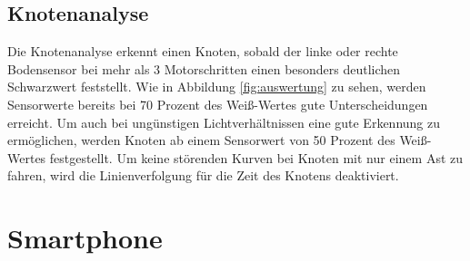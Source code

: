 \documentclass[10pt,a4paper]{article}
\let\oldsection\section
\renewcommand{\section}{\newpage \oldsection}
\begin{document}
			\subsection{Knotenanalyse}
			Die Knotenanalyse erkennt einen Knoten, sobald der linke oder rechte Bodensensor bei mehr als 3 Motorschritten einen besonders
			deutlichen Schwarzwert feststellt. Wie in Abbildung \ref{fig:auswertung} zu sehen, werden Sensorwerte bereits bei 70 Prozent des
			Weiß-Wertes gute Unterscheidungen erreicht. Um auch bei ungünstigen Lichtverhältnissen eine gute Erkennung zu ermöglichen,
			werden Knoten ab einem Sensorwert von 50 Prozent des Weiß-Wertes festgestellt. Um keine störenden Kurven bei Knoten mit nur einem
			Ast zu fahren, wird die Linienverfolgung für die Zeit des Knotens deaktiviert. 

				
			
		\section{Smartphone}
\end{document}
